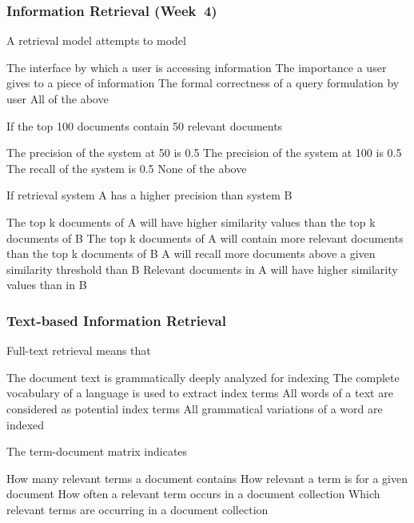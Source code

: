 \documentclass[12pt,a4paper,answers]{exam} %
\begin{document}
\begin{flushleft}
\begin{multicols*}{2}
\begin{questions}
\subsubsection{Information Retrieval (Week~4)}

\question A retrieval model attempts to model
\begin{checkboxes}
\choice The interface by which a user is accessing information
\CorrectChoice The importance a user gives to a piece of information
\choice The formal correctness of a query formulation by user
\choice All of the above
\end{checkboxes}

\question If the top 100 documents contain 50 relevant documents
\begin{checkboxes}
\choice The precision of the system at 50 is 0.5
\CorrectChoice The precision of the system at 100 is 0.5
\choice The recall of the system is 0.5
\choice None of the above
\end{checkboxes}

\question If retrieval system A has a higher precision than system B
\begin{checkboxes}
\choice The top k documents of A will have higher similarity values than the top k documents of B
\CorrectChoice The top k documents of A will contain more relevant documents than the top k documents of B
\choice A will recall more documents above a given similarity threshold than B
\choice Relevant documents in A will have higher similarity values than in B
\end{checkboxes}


\subsubsection{Text-based Information Retrieval}

\question Full-text retrieval means that
\begin{checkboxes}
\choice The document text is grammatically deeply analyzed for indexing
\choice The complete vocabulary of a language is used to extract index terms
\CorrectChoice All words of a text are considered as potential index terms
\choice All grammatical variations of a word are indexed
\end{checkboxes}

\question The term-document matrix indicates
\begin{checkboxes}
\CorrectChoice How many relevant terms a document contains
\choice How relevant a term is for a given document
\CorrectChoice How often a relevant term occurs in a document collection
\CorrectChoice Which relevant terms are occurring in a document collection
\end{checkboxes}


\end{questions}
\end{multicols*}
\end{flushleft}
\end{document}

